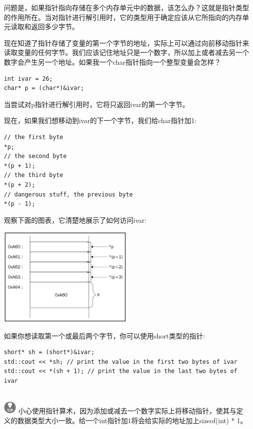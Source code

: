问题是，如果指针指向存储在多个内存单元中的数据，该怎么办？这就是指针类型的作用所在。当对指针进行解引用时，它的类型用于确定应该从它所指向的内存单元读取和返回多少字节。 \par
现在知道了指针存储了变量的第一个字节的地址，实际上可以通过向前移动指针来读取变量的任何字节。我们应该记住地址只是一个数字，所以加上或者减去另一个数字会产生另一个地址。如果我一个char指针指向一个整型变量会怎样？ \par

\begin{lstlisting}[caption={}]
int ivar = 26;
char* p = (char*)&ivar;
\end{lstlisting}

当尝试对p指针进行解引用时，它将只返回ivar的第一个字节。\par
现在，如果我们想移动到ivar的下一个字节，我们给char指针加1: \par

\begin{lstlisting}[caption={}]
// the first byte
*p;
// the second byte
*(p + 1);
// the third byte
*(p + 2);
// dangerous stuff, the previous byte
*(p - 1);
\end{lstlisting}

观察下面的图表，它清楚地展示了如何访问ivar:\par

\begin{center}
	\includegraphics[width=0.5\textwidth]{content/Section-1/Chapter-2/11}
\end{center}

如果你想读取第一个或最后两个字节，你可以使用short类型的指针: \par

\begin{lstlisting}[caption={}]
short* sh = (short*)&ivar;
std::cout << *sh; // print the value in the first two bytes of ivar
std::cout << *(sh + 1); // print the value in the last two bytes of ivar
\end{lstlisting}

\hspace*{\fill} \\ %
\includegraphics[width=0.05\textwidth]{images/tip}
小心使用指针算术，因为添加或减去一个数字实际上将移动指针，使其与定义的数据类型大小一致。给一个int指针加1将会给实际的地址加上sizeof(int) * 1。 \par
\noindent\textbf{}\ \par

